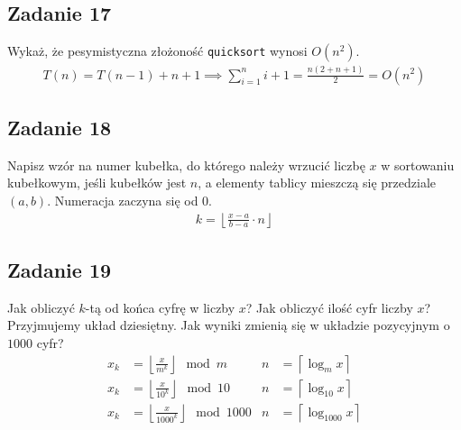 \documentclass{article}
\begin{document}
\subsection*{Zadanie 17}
Wykaż, że pesymistyczna złożoność \verb+quicksort+ wynosi $O(n^2)$.
\begin{gather*}
    T(n) = T(n-1) + n + 1 \implies \sum_{i=1}^{n} i + 1 = \frac{n(2 + n + 1)}{2} = O(n^2)
\end{gather*}

\subsection*{Zadanie 18}
Napisz wzór na numer kubełka, do którego należy wrzucić liczbę $x$ w sortowaniu
kubełkowym, jeśli kubełków jest $n$, a elementy tablicy mieszczą się przedziale $(a, b)$.
Numeracja zaczyna się od $0$.
\begin{gather*}
    k = \left \lfloor \frac{x - a}{b - a} \cdot n \right \rfloor
\end{gather*}

\subsection*{Zadanie 19}
Jak obliczyć $k$-tą od końca cyfrę w liczby $x$? Jak obliczyć ilość cyfr liczby $x$?
Przyjmujemy układ dziesiętny. Jak wyniki zmienią się w układzie pozycyjnym o $1000$ cyfr?
\begin{align*}
    x_k & = \left \lfloor \frac{x}{m^k} \right \rfloor \mod m       & n & = \left \lceil \log_m x \right \rceil      \\
    x_k & = \left \lfloor \frac{x}{10^k} \right \rfloor \mod 10     & n & = \left \lceil \log_{10} x \right \rceil   \\
    x_k & = \left \lfloor \frac{x}{1000^k} \right \rfloor \mod 1000 & n & = \left \lceil \log_{1000} x \right \rceil
\end{align*}
\end{document}
